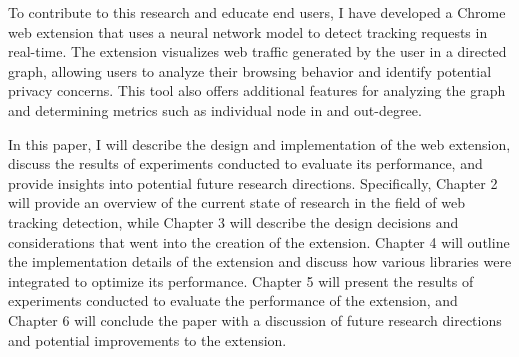 To contribute to this research and educate end users, I have developed a Chrome web extension
that uses a neural network model to detect tracking requests in real-time. 
The extension visualizes web traffic generated by the user in a directed graph,
allowing users to analyze their browsing behavior and identify potential privacy concerns.
This tool also offers additional features for analyzing the graph and determining metrics such as individual node in and out-degree.

In this paper, I will describe the design and implementation of the web extension,
discuss the results of experiments conducted to evaluate its performance,
and provide insights into potential future research directions.
Specifically, Chapter 2 will provide an overview of the current state of research
in the field of web tracking detection, while Chapter 3 will describe the design decisions
and considerations that went into the creation of the extension. 
Chapter 4 will outline the implementation details of the extension and
discuss how various libraries were integrated to optimize its performance.
Chapter 5 will present the results of experiments conducted to evaluate
the performance of the extension, and Chapter 6 will conclude the paper
with a discussion of future research directions and potential improvements to the extension.



